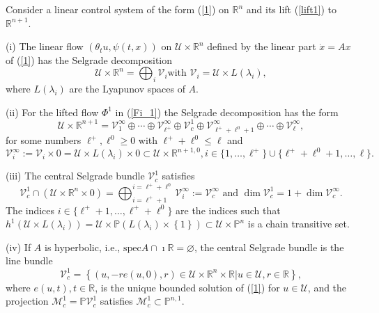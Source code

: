 \documentclass{siamltex}%
\begin{document}
\begin{theorem}
\label{Theorem_Selgrade1}Consider a linear control system of the form
(\ref{1}) on $\mathbb{R}^{n}$ and its lift (\ref{lift1}) to $\mathbb{R}^{n+1}$.

(i) The linear flow $(\theta_{t}u,\psi(t,x))$ on $\mathcal{U}\times
\mathbb{R}^{n}$ defined by the linear part $\dot{x}=Ax$ of (\ref{1}) has the
Selgrade decomposition%
\[
\mathcal{U}\times\mathbb{R}^{n}=\bigoplus\nolimits_{i}\mathcal{V}_{i}\text{
with }\mathcal{V}_{i}=\mathcal{U}\times L(\lambda_{i}),
\]
where $L(\lambda_{i})$ are the Lyapunov spaces of $A$.

(ii) For the lifted flow $\Phi^{1}$ in (\ref{Fi_1}) the Selgrade decomposition
has the form
\begin{equation}
\mathcal{U}\times\mathbb{R}^{n+1}=\mathcal{V}_{1}^{\infty}\oplus\cdots
\oplus\mathcal{V}_{\ell^{+}}^{\infty}\oplus\mathcal{V}_{c}^{1}\oplus
\mathcal{V}_{\ell^{+}+\ell^{0}+1}^{\infty}\oplus\cdots\oplus\mathcal{V}_{\ell
}^{\infty}, \label{Sel4}%
\end{equation}
for some numbers $\ell^{+},\ell^{0}\geq0$ with $\ell^{+}+\ell^{0}\leq\ell$
and
\[
\mathcal{V}_{i}^{\infty}:=\mathcal{V}_{i}\times0=\mathcal{U}\times
L(\lambda_{i})\times0\subset\mathcal{U}\times\mathbb{R}^{n+1,0},i\in
\{1,\ldots,\ell^{+}\}\cup\{\ell^{+}+\ell^{0}+1,\ldots,\ell\}.
\]


(iii) The central Selgrade bundle $\mathcal{V}_{c}^{1}$ satisfies
\[
\mathcal{V}_{c}^{1}\cap\left(  \mathcal{U}\times\mathbb{R}^{n}\times0\right)
=\bigoplus_{i=\ell^{+}+1}^{i=\ell^{+}+\ell^{0}}\mathcal{V}_{i}^{\infty
}:=\mathcal{V}_{c}^{\infty}\text{ and }\dim\mathcal{V}_{c}^{1}=1+\dim
\mathcal{V}_{c}^{\infty}.
\]
The indices $i\in\{\ell^{+}+1,\ldots,\ell^{+}+\ell^{0}\}$ are the indices such
that $h^{1}(\mathcal{U}\times L(\lambda_{i}))=\mathcal{U}\times\mathbb{P}%
\left(  L(\lambda_{i})\times\left\{  1\right\}  \right)  \subset
\mathcal{U}\times\mathbb{P}^{n}$ is a chain transitive set.

(iv) If $A$ is hyperbolic, i.e., $\mathrm{spec}A\cap\imath\mathbb{R}%
=\varnothing$, the central Selgrade bundle is the line bundle%
\[
\mathcal{V}_{c}^{1}=\left\{  (u,-re(u,0),r)\in\mathcal{U}\times\mathbb{R}%
^{n}\times\mathbb{R}\left\vert u\in\mathcal{U},r\in\mathbb{R}\right.
\right\}  ,
\]
where $e(u,t),t\in\mathbb{R}$, is the unique bounded solution of (\ref{1}) for
$u\in\mathcal{U}$, and the projection $\mathcal{M}_{c}^{1}=\mathbb{P}%
\mathcal{V}_{c}^{1}$ satisfies $\mathcal{M}_{c}^{1}\subset\mathbb{P}^{n,1}$.
\end{theorem}
\end{document}
